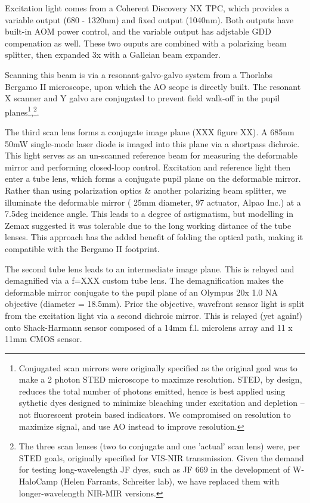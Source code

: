 \documentclass[a4paper,10pt]{article}
\begin{document}
Excitation light comes from a Coherent Discovery NX TPC, which provides a variable output (680 - 1320nm) and fixed output (1040nm).  Both outputs have built-in AOM power control, and the variable output has adjstable GDD compenation as well.  These two ouputs are combined with a polarizing beam splitter, then expanded 3x with a Galleian beam expander.  

Scanning this beam is via a resonant-galvo-galvo system from a Thorlabs Bergamo II microscope, upon which the AO scope is directly built.  The resonant X scanner and Y galvo are conjugated to prevent field walk-off in the pupil planes\footnote{Conjugated scan mirrors were originally specified as the original goal was to make a 2 photon STED microscope to maximze resolution.  STED, by design, reduces the total number of photons emitted, hence is best applied using sythetic dyes designed to minimize bleaching under excitation and depletion -- not fluorescent protein based indicators.  We compromised on resolution to maximize signal, and use AO instead to improve resolution. },\footnote{The three scan lenses (two to conjugate and one 'actual' scan lens) were, per STED goals, originally specified for VIS-NIR transmission.  Given the demand for testing long-wavelength JF dyes, such as JF 669 in the development of W-HaloCamp (Helen Farrants, Schreiter lab), we have replaced them with longer-wavelength NIR-MIR versions.}.  

The third scan lens forms a conjugate image plane (XXX figure XX).  A 685nm 50mW single-mode laser diode is imaged into this plane via a shortpass dichroic.  This light serves as an un-scanned reference beam for measuring the deformable mirror and performing closed-loop control.  Excitation and reference light then enter a tube lens, which forms a conjugate pupil plane on the deformable mirror.  Rather than using polarization optics \& another polarizing beam splitter, we illuminate the deformable mirror ( 25mm diameter, 97 actuator, Alpao Inc.) at a 7.5deg incidence angle.  This leads to a degree of astigmatism, but modelling in Zemax suggested it was tolerable due to the long working distance of the tube lenses.  This approach has the added benefit of folding the optical path, making it compatible with the Bergamo II footprint.  

The second tube lens leads to an intermediate image plane.  This is relayed and demagnified via a f=XXX custom tube lens.  The demagnification makes the deformable mirror conjugate to the pupil plane of an Olympus 20x 1.0 NA objective (diameter = 18.5mm).  Prior the objective, wavefront sensor light is split from the excitation light via a second dichroic mirror.  This is relayed (yet again!) onto Shack-Harmann sensor composed of a 14mm f.l. microlens array and 11 x 11mm CMOS sensor.  
\end{document}
